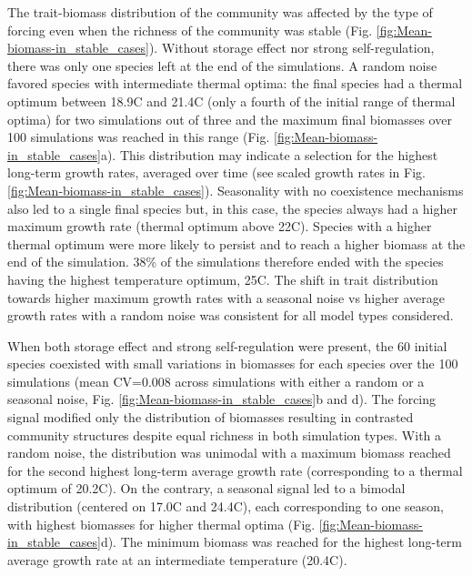 \documentclass[a4paper,12pt]{article}
\begin{document}
The trait-biomass distribution of the community was affected by the
type of forcing even when the richness of the community was stable
(Fig. \ref{fig:Mean-biomass-in_stable_cases}). Without storage effect
nor strong self-regulation, there was only one species left at the
end of the simulations. A random noise favored species with intermediate
thermal optima: the final species had a thermal optimum between 18.9\textdegree C
and 21.4\textdegree C (only a fourth of the initial range of thermal optima)
for two simulations out of three and the maximum final biomasses over
100 simulations was reached in this range (Fig. \ref{fig:Mean-biomass-in_stable_cases}a).
This distribution may indicate a selection for the highest long-term
growth rates, averaged over time (see scaled growth rates in Fig.
\ref{fig:Mean-biomass-in_stable_cases}). Seasonality with no coexistence
mechanisms also led to a single final species but, in this case, the
species always had a higher maximum growth rate (thermal optimum above
22\textdegree C). Species with a higher thermal optimum were more likely to persist
and to reach a higher biomass at the end of the simulation. 38\% of
the simulations therefore ended with the species having the highest
temperature optimum, 25\textdegree C. The shift in trait distribution towards
higher maximum growth rates with a seasonal noise vs higher average
growth rates with a random noise was consistent for all model types
considered. 

When both storage effect and strong self-regulation were present,
the 60 initial species coexisted with small variations in biomasses
for each species over the 100 simulations (mean CV=0.008 across simulations
with either a random or a seasonal noise, Fig. \ref{fig:Mean-biomass-in_stable_cases}b
and d). The forcing signal modified only the distribution of biomasses
resulting in contrasted community structures despite equal richness
in both simulation types. With a random noise, the distribution was
unimodal with a maximum biomass reached for the second highest long-term
average growth rate (corresponding to a thermal optimum of 20.2\textdegree C).
On the contrary, a seasonal signal led to a bimodal distribution (centered
on 17.0\textdegree C and 24.4\textdegree C), each corresponding to one season, with highest
biomasses for higher thermal optima (Fig. \ref{fig:Mean-biomass-in_stable_cases}d).
The minimum biomass was reached for the highest long-term average
growth rate at an intermediate temperature (20.4\textdegree C).
\end{document}
